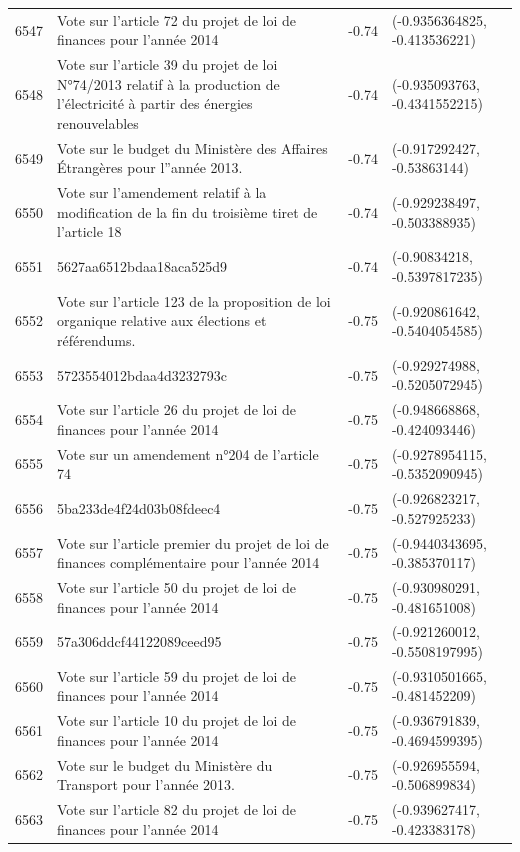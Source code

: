 \begin{table}[ht]
\begin{tabular}{rlrl}
  6547 & Vote sur l'article 72 du projet de loi de finances pour l'année 2014 & -0.74 & (-0.9356364825, -0.413536221) \\ 
  6548 & Vote sur l'article 39 du projet de loi N°74/2013 relatif à la production de l'électricité à partir des énergies renouvelables & -0.74 & (-0.935093763, -0.4341552215) \\ 
  6549 & Vote sur le budget du Ministère des Affaires Étrangères pour l''année 2013. & -0.74 & (-0.917292427, -0.53863144) \\ 
  6550 & Vote sur l'amendement relatif à la modification de la fin du troisième tiret de l'article 18 & -0.74 & (-0.929238497, -0.503388935) \\ 
  6551 & 5627aa6512bdaa18aca525d9 & -0.74 & (-0.90834218, -0.5397817235) \\ 
  6552 & Vote sur l'article 123 de la proposition de loi organique relative aux élections et référendums. & -0.75 & (-0.920861642, -0.5404054585) \\ 
  6553 & 5723554012bdaa4d3232793c & -0.75 & (-0.929274988, -0.5205072945) \\ 
  6554 & Vote sur l'article 26 du projet de loi de finances pour l'année 2014 & -0.75 & (-0.948668868, -0.424093446) \\ 
  6555 & Vote sur un amendement n°204 de l'article 74 & -0.75 & (-0.9278954115, -0.5352090945) \\ 
  6556 & 5ba233de4f24d03b08fdeec4 & -0.75 & (-0.926823217, -0.527925233) \\ 
  6557 & Vote sur l'article premier du projet de loi de finances complémentaire pour l'année 2014 & -0.75 & (-0.9440343695, -0.385370117) \\ 
  6558 & Vote sur l'article 50 du projet de loi de finances pour l'année 2014 & -0.75 & (-0.930980291, -0.481651008) \\ 
  6559 & 57a306ddcf44122089ceed95 & -0.75 & (-0.921260012, -0.5508197995) \\ 
  6560 & Vote sur l'article 59 du projet de loi de finances pour l'année 2014 & -0.75 & (-0.9310501665, -0.481452209) \\ 
  6561 & Vote sur l'article 10 du projet de loi de finances pour l'année 2014 & -0.75 & (-0.936791839, -0.4694599395) \\ 
  6562 & Vote sur le budget du Ministère du Transport pour l'année 2013. & -0.75 & (-0.926955594, -0.506899834) \\ 
  6563 & Vote sur l'article 82 du projet de loi de finances pour l'année 2014 & -0.75 & (-0.939627417, -0.423383178) \\ 

\end{tabular}
\end{table}
